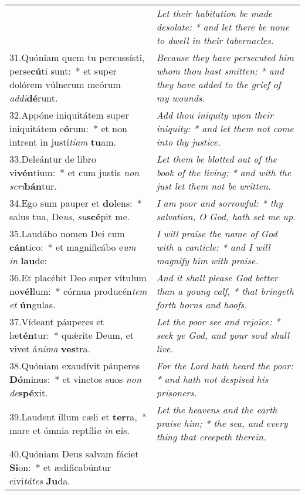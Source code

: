 \begin{longtable}{@{\hskip0pt} p{9.5cm} | p{6.5cm} @{\hskip0pt}}
 & \textit{\small Let their habitation be made desolate: * and let there be none to dwell in their tabernacles.
}\\
31.\enspace Quóniam quem tu percussísti, perse\textbf{cú}ti sunt:~* et super dolórem vúlnerum meórum \textit{ad}\textit{di}\textbf{dé}runt.
 & \textit{\small Because they have persecuted him whom thou hast smitten; * and they have added to the grief of my wounds.
}\\
32.\enspace Appóne iniquitátem super iniquitátem e\textbf{ó}rum:~* et non intrent in justí\textit{ti}\textit{am} \textbf{tu}am.
 & \textit{\small Add thou iniquity upon their iniquity: * and let them not come into thy justice.
}\\
33.\enspace Deleántur de libro vi\textbf{vén}tium:~* et cum justis \textit{non} \textit{scri}\textbf{bán}tur.
 & \textit{\small Let them be blotted out of the book of the living; * and with the just let them not be written.
}\\
34.\enspace Ego sum pauper et \textbf{do}lens:~* salus tua, De\textit{us}, \textit{su}\textbf{scé}pit me.
 & \textit{\small I am poor and sorrowful: * thy salvation, O God, hath set me up.
}\\
35.\enspace Laudábo nomen Dei cum \textbf{cán}tico:~* et magnificábo e\textit{um} \textit{in} \textbf{lau}de:
 & \textit{\small I will praise the name of God with a canticle: * and I will magnify him with praise.
}\\
36.\enspace Et placébit Deo super vítulum no\textbf{vél}lum:~* córnua producén\textit{tem} \textit{et} \textbf{ún}gulas.
 & \textit{\small And it shall please God better than a young calf, * that bringeth forth horns and hoofs.
}\\
37.\enspace Vídeant páuperes et læ\textbf{tén}tur:~* qu\'{\ae}rite Deum, et vivet á\textit{ni}\textit{ma} \textbf{ves}tra.
 & \textit{\small Let the poor see and rejoice: * seek ye God, and your soul shall live.
}\\
38.\enspace Quóniam exaudívit páuperes \textbf{Dó}minus:~* et vinctos suos \textit{non} \textit{de}\textbf{spé}xit.
 & \textit{\small For the Lord hath heard the poor: * and hath not despised his prisoners.
}\\
39.\enspace Laudent illum cæli et \textbf{ter}ra,~* mare et ómnia reptíli\textit{a} \textit{in} \textbf{e}is.
 & \textit{\small Let the heavens and the earth praise him; * the sea, and every thing that creepeth therein.
}\\
40.\enspace Quóniam Deus salvam fáciet \textbf{Si}on:~* et ædificabúntur civi\textit{tá}\textit{tes} \textbf{Ju}da.

\end{longtable}

